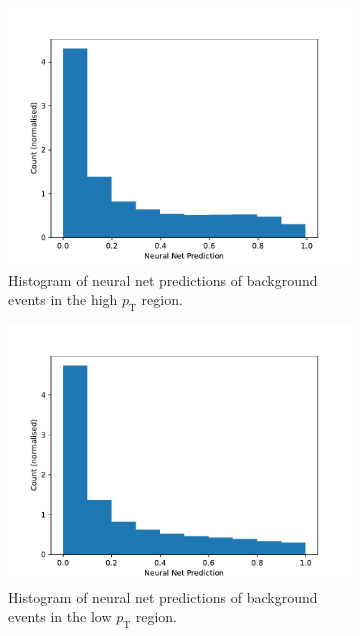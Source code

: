 \documentclass[11pt]{article}
\numberwithin{equation}{section}
\numberwithin{figure}{section}
\numberwithin{table}{section}
\begin{document}
\begin{figure}[h]%
    \centering
    \begin{subfigure}[t]{.49\linewidth}
        \centering
        \includegraphics[width=\linewidth]{Plots/bkg_high_pt.pdf}
        \caption{Histogram of neural net predictions of background events in the high $p_\mathrm{T}$ region.}
        \label{fig:bkg_high_pt}
    \end{subfigure}
    \hfill
    \begin{subfigure}[t]{.49\linewidth}
        \centering
        \includegraphics[width=\linewidth]{Plots/bkg_low_pt.pdf}
        \caption{Histogram of neural net predictions of background events in the low $p_\mathrm{T}$ region.}
        \label{fig:bkg_low_pt}
    \end{subfigure}
\caption{}
\label{fig:bkg_high_low}
\end{figure}
\end{document}
